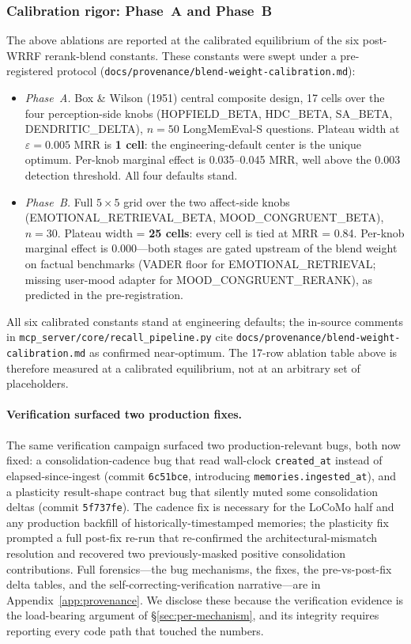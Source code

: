 \documentclass[11pt]{article}
\begin{document}
\subsubsection{Calibration rigor: Phase~A and Phase~B}
\label{sec:calibration}

The above ablations are reported at the calibrated equilibrium of
the six post-WRRF rerank-blend constants.  These constants were
swept under a pre-registered protocol
(\texttt{docs/provenance/blend-weight-calibration.md}):

\begin{itemize}
\item \emph{Phase~A.}  Box \& Wilson (1951) central composite design,
  17 cells over the four perception-side knobs (HOPFIELD\_BETA,
  HDC\_BETA, SA\_BETA, DENDRITIC\_DELTA), $n = 50$ LongMemEval-S
  questions.  Plateau width at $\varepsilon = 0.005$ MRR is
  \textbf{1 cell}: the engineering-default center is the unique
  optimum.  Per-knob marginal effect is 0.035--0.045 MRR, well above
  the 0.003 detection threshold.  All four defaults stand.
\item \emph{Phase~B.}  Full $5{\times}5$ grid over the two
  affect-side knobs (EMOTIONAL\_RETRIEVAL\_BETA,
  MOOD\_CONGRUENT\_BETA), $n = 30$.  Plateau width = \textbf{25
  cells}: every cell is tied at MRR = 0.84.  Per-knob marginal
  effect is 0.000---both stages are gated upstream of the blend
  weight on factual benchmarks (VADER floor for
  EMOTIONAL\_RETRIEVAL; missing user-mood adapter for
  MOOD\_CONGRUENT\_RERANK), as predicted in the pre-registration.
\end{itemize}

All six calibrated constants stand at engineering defaults; the
in-source comments in \texttt{mcp\_server/core/recall\_pipeline.py}
cite \texttt{docs/provenance/blend-weight-calibration.md} as confirmed
near-optimum.  The 17-row ablation table above is therefore
measured at a calibrated equilibrium, not at an arbitrary set of
placeholders.

\paragraph{Verification surfaced two production fixes.}
The same verification campaign surfaced two production-relevant bugs,
both now fixed: a consolidation-cadence bug that read wall-clock
\texttt{created\_at} instead of elapsed-since-ingest (commit
\texttt{6c51bce}, introducing \texttt{memories.ingested\_at}), and a
plasticity result-shape contract bug that silently muted some
consolidation deltas (commit \texttt{5f737fe}).  The cadence fix is
necessary for the LoCoMo half and any production backfill of
historically-timestamped memories; the plasticity fix prompted a
full post-fix re-run that re-confirmed the architectural-mismatch
resolution and recovered two previously-masked positive
consolidation contributions.  Full forensics---the bug mechanisms,
the fixes, the pre-vs-post-fix delta tables, and the
self-correcting-verification narrative---are in
Appendix~\ref{app:provenance}.  We disclose these because the
verification evidence is the load-bearing argument of
\S\ref{sec:per-mechanism}, and its integrity requires reporting every
code path that touched the numbers.
\end{document}
